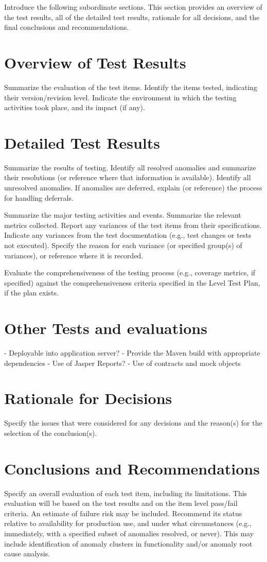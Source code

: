 Introduce the following subordinate sections. This section provides an overview of the test results, all
of the detailed test results, rationale for all decisions, and the final conclusions and recommendations.

\section{Overview of Test Results}
Summarize the evaluation of the test items. Identify the items tested, indicating their version/revision
level. Indicate the environment in which the testing activities took place, and its impact (if any).

\section{Detailed Test Results}
Summarize the results of testing. Identify all resolved anomalies and summarize their resolutions (or
reference where that information is available). Identify all unresolved anomalies. If anomalies are
deferred, explain (or reference) the process for handling deferrals.\par

Summarize the major testing activities and events. Summarize the relevant metrics collected.
Report any variances of the test items from their specifications. Indicate any variances from the test
documentation (e.g., test changes or tests not executed). Specify the reason for each variance (or
specified group(s) of variances), or reference where it is recorded.\par

Evaluate the comprehensiveness of the testing process (e.g., coverage metrics, if specified) against the
comprehensiveness criteria specified in the Level Test Plan, if the plan exists.

\section{Other Tests and evaluations}
- Deployable into application server?
- Provide the Maven build with appropriate dependencies
- Use of Jasper Reports?
- Use of contracts and mock objects

\section{Rationale for Decisions}
Specify the issues that were considered for any decisions and the reason(s) for the selection of the
conclusion(s).

\section{Conclusions and Recommendations}
Specify an overall evaluation of each test item, including its limitations. This evaluation will be based
on the test results and on the item level pass/fail criteria. An estimate of failure risk may be included.
Recommend its status relative to availability for production use, and under what circumstances (e.g.,
immediately, with a specified subset of anomalies resolved, or never). This may include identification
of anomaly clusters in functionality and/or anomaly root cause analysis.
